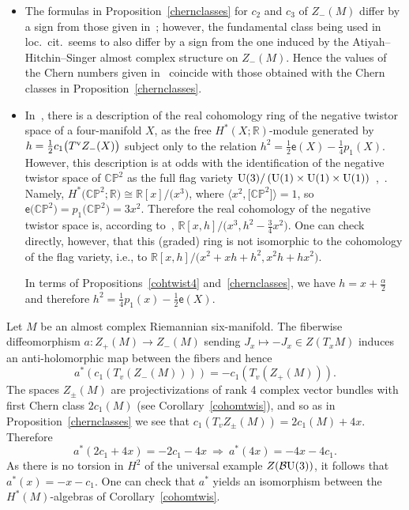 \documentclass[pdftex]{sigma}%
\newcommand{\R}{\mathbb{R}}
\newcommand{\CP}{\mathbb{CP}}
\numberwithin{equation}{section}
\begin{document}
\begin{Remark}\label{hitchin} \quad
\begin{itemize}\itemsep=0pt

\item The formulas in Proposition~\ref{chernclasses} for $c_2$ and $c_3$ of $Z_-(M)$ differ by a sign from those given in~\cite[p.~135]{Hi81}; however, the fundamental class being used in loc.\ cit.\ seems to also differ by a sign from the one induced by the Atiyah--Hitchin--Singer almost complex structure on $Z_-(M)$. Hence the values of the Chern numbers given in~\cite[equation~(1.5)]{Hi81} coincide with those obtained with the Chern classes in Proposition~\ref{chernclasses}.

\item In~\cite[equation~(1.4)]{Hi81}, there is a description of the real cohomology ring of the negative twistor space of a four-manifold $X$, as the free $H^*(X;\R)$-module generated by $h=\frac{1}{2}c_1\big(T^{\rm v} Z_-(X)\big)$ subject only to the relation $h^2 = \tfrac{1}{2}\mathsf{e}(X) - \tfrac{1}{4}p_1(X)$.
However, this description is at odds with the identification of the negative twistor space of $\CP^2$ as the full flag variety ${\rm U}(3)/\left( {\rm U}(1)\times {\rm U}(1) \times {\rm U}(1) \right)$~\cite[p.~133]{Hi81},~\cite[p.~217, Example~1]{Sa84}. Namely, $H^*\big(\CP^2;\R\big) \cong \R[x]/\big(x^3\big)$, where $\big\langle x^2, \big[\CP^2\big] \big\rangle = 1$, so $\mathsf{e}\big(\CP^2\big) = p_1\big(\CP^2\big) = 3x^2$. Therefore the real cohomology of the negative twistor space is,
according to~\cite[equation~(1.4)]{Hi81}, $\R[x,h]/\big(x^3, h^2 - \tfrac{3}{4}x^2\big)$. One can check directly, however, that this (graded) ring is not isomorphic to the cohomology of the flag variety, i.e., to $\R[x,h]/\big(x^2+xh+h^2, x^2 h + h x^2\big)$.

In terms of Propositions~\ref{cohtwist4} and~\ref{chernclasses}, we have $h=x+\frac{\alpha}{2}$ and therefore $h^2=\frac{1}{4} p_1(x) - \frac{1}{2} \mathsf{e}(X)$.
\end{itemize}
\end{Remark}

\begin{Remark}
Let $M$ be an almost complex Riemannian six-manifold.
The fiberwise diffeomorphism $a\colon Z_+(M) \to Z_-(M)$ sending
$J_x \mapsto -J_x \in Z(T_xM)$ induces an anti-holomorphic map
between the fibers and hence
\[
a^*(c_1(T_v(Z_-(M)))) = -c_1(T_v(Z_+(M))).
\]
The spaces $Z_\pm(M)$ are projectivizations of rank 4 complex vector bundles with first Chern class $2c_1(M)$ (see Corollary~\ref{cohomtwis}), and so as in Proposition~\ref{chernclasses} we see that $c_1(T_v Z_\pm(M))=2c_1(M)+4x$. Therefore
\[
a^*(2c_1 + 4x) = -2c_1 - 4x \ \Rightarrow \ a^*(4x) = -4x-4c_1.
\]
As there is no torsion in $H^2$ of the universal example $Z({\mathcal B}{\rm U}(3))$, it follows that $a^*(x)=-x-c_1$. One can check that $a^*$ yields an isomorphism between the $H^*(M)$-algebras of Corollary~\ref{cohomtwis}.
\end{Remark}
\end{document}
